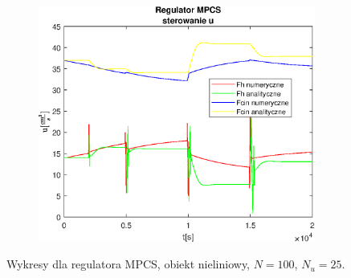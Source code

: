 \begin{figure}[h!]
   \begin{subfigure}[b]{0.4\textwidth}
      \includegraphics[width=1\linewidth]{img/MPCSnumRK/MPCSRKControlN100Nu25l5.eps}
      \caption{}
      \label{fig:fig:MPCSRKN100Nu25l53}
   \end{subfigure}
       
   \caption{Wykresy dla regulatora MPCS, obiekt nieliniowy, $N = 100$, $N_u = 25$.}
   \label{fig:MPCSRKN100Nu25l5}
\end{figure}
           
